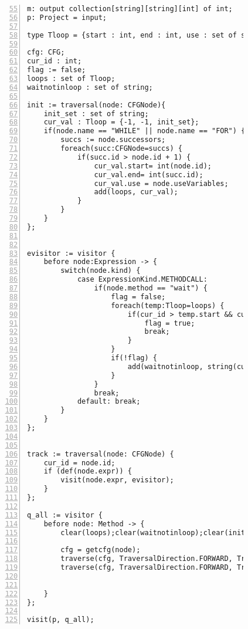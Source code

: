 \begin{figure}[ht!]
\begin{lstlisting}[numbers=left, tabsize=4, escapechar=@, caption={Wait not in loop},label={lst:wnil-code}, firstline = 55, firstnumber = 55] 
m: output collection[string][string][int] of int;
p: Project = input;

type Tloop = {start : int, end : int, use : set of string};

cfg: CFG;
cur_id : int;
flag := false;
loops : set of Tloop;
waitnotinloop : set of string;

init := traversal(node: CFGNode){
	init_set : set of string;
	cur_val : Tloop = {-1, -1, init_set};
	if(node.name == "WHILE" || node.name == "FOR") {
		succs := node.successors;
		foreach(succ:CFGNode=succs) {
			if(succ.id > node.id + 1) {
				cur_val.start= int(node.id);
				cur_val.end= int(succ.id);
				cur_val.use = node.useVariables;
				add(loops, cur_val);
			}		
		}
	}
};


evisitor := visitor {
	before node:Expression -> {
		switch(node.kind) {
			case ExpressionKind.METHODCALL: 
				if(node.method == "wait") {
					flag = false;
					foreach(temp:Tloop=loops) {
						if(cur_id > temp.start && cur_id < temp.end) {
							flag = true;
							break;
						}
					}
					if(!flag) {
						add(waitnotinloop, string(cur_id));
					}
				}
  				break;
			default: break;
		}
	}
};


track := traversal(node: CFGNode) {
	cur_id = node.id;
	if (def(node.expr)) {
		visit(node.expr, evisitor);
	}
};

q_all := visitor {
	before node: Method -> {
		clear(loops);clear(waitnotinloop);clear(init);clear(track);

		cfg = getcfg(node);
		traverse(cfg, TraversalDirection.FORWARD, TraversalKind.DFS, init);
		traverse(cfg, TraversalDirection.FORWARD, TraversalKind.DFS, track);


	}
};

visit(p, q_all);
\end{lstlisting}
\end{figure}